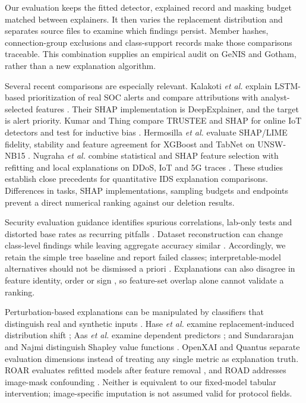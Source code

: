 \documentclass[journal,letterpaper]{IEEEtran}
\begin{document}
Our evaluation keeps the fitted detector, explained record and masking budget matched between explainers. It then varies the replacement distribution and separates source files to examine which findings persist. Member hashes, connection-group exclusions and class-support records make those comparisons traceable. This combination supplies an empirical audit on GeNIS and Gotham, rather than a new explanation algorithm.

Several recent comparisons are especially relevant. Kalakoti \emph{et al.} explain LSTM-based prioritization of real SOC alerts and compare attributions with analyst-selected features \cite{ref17}. Their SHAP implementation is DeepExplainer, and the target is alert priority. Kumar and Thing compare TRUSTEE and SHAP for online IoT detectors and test for inductive bias \cite{ref18}. Hermosilla \emph{et al.} evaluate SHAP/LIME fidelity, stability and feature agreement for XGBoost and TabNet on UNSW-NB15 \cite{ref19}. Nugraha \emph{et al.} combine statistical and SHAP feature selection with refitting and local explanations on DDoS, IoT and 5G traces \cite{ref20}. These studies establish close precedents for quantitative IDS explanation comparisons. Differences in tasks, SHAP implementations, sampling budgets and endpoints prevent a direct numerical ranking against our deletion results.

Security evaluation guidance identifies spurious correlations, lab-only tests and distorted base rates as recurring pitfalls \cite{ref21}. Dataset reconstruction can change class-level findings while leaving aggregate accuracy similar \cite{ref22}. Accordingly, we retain the simple tree baseline and report failed classes; interpretable-model alternatives should not be dismissed a priori \cite{ref23}. Explanations can also disagree in feature identity, order or sign \cite{ref24}, so feature-set overlap alone cannot validate a ranking.

Perturbation-based explanations can be manipulated by classifiers that distinguish real and synthetic inputs \cite{ref25}. Hase \emph{et al.} examine replacement-induced distribution shift \cite{ref26}; Aas \emph{et al.} examine dependent predictors \cite{ref27}; and Sundararajan and Najmi distinguish Shapley value functions \cite{ref28}. OpenXAI \cite{ref29} and Quantus \cite{ref30} separate evaluation dimensions instead of treating any single metric as explanation truth. ROAR evaluates refitted models after feature removal \cite{ref31}, and ROAD addresses image-mask confounding \cite{ref32}. Neither is equivalent to our fixed-model tabular intervention; image-specific imputation is not assumed valid for protocol fields.
\end{document}
